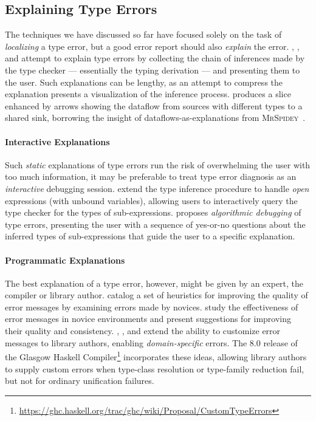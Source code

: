 \subsection{Explaining Type Errors}
\label{sec:explaining-type-errors}
The techniques we have discussed so far have focused solely on the task
of \emph{localizing} a type error, but a good error report should also
\emph{explain} the error.
%
\citet{Wand1986-nw}, \citet{Beaven1993-hb}, and \citet{Duggan1996-by}
attempt to explain type errors by collecting the chain of inferences
made by the type checker --- essentially the typing derivation ---
and presenting them to the user.
%
Such explanations can be lengthy, as an attempt to compress the
explanation \citet{Yang2000-kz} presents a visualization of the
inference process.
%
\citet{Gast2004-zd} produces a slice enhanced by arrows
showing the dataflow from sources with different types to a
shared sink, borrowing the insight of dataflows-as-explanations from
\textsc{MrSpidey}~\citep{Flanagan1996-bu}.
%

\paragraph{Interactive Explanations}
Such \emph{static} explanations of type errors run the risk of
overwhelming the user with too much information, it may be preferable to
treat type error diagnosis as an \emph{interactive} debugging session.
%
\citet{Bernstein1995-yj} extend the type inference procedure to handle
\emph{open} expressions (\ie with unbound variables), allowing users to
interactively query the type checker for the types of sub-expressions.
%
\citet{Chitil2001-td} proposes \emph{algorithmic debugging} of type
errors, presenting the user with a sequence of yes-or-no questions about
the inferred types of sub-expressions that guide the user to a specific
explanation.

\paragraph{Programmatic Explanations}
%
The best explanation of a type error, however, might be given by an
expert, \eg the compiler or library author.
%
\citet{Hage2006-hc} catalog a set of heuristics for
improving the quality of error messages by examining errors made by
novices.
%
\citet{Marceau2011-ok,Marceau2011-cy} study the effectiveness of error
messages in novice environments and present suggestions for improving
their quality and consistency.
%
\citet{Heeren2003-db}, \citet{Christiansen2014-qc}, and
\citet{Serrano2016-oo} extend the ability to customize error messages to
library authors, enabling \emph{domain-specific} errors.
%
The 8.0 release of the
Glasgow Haskell Compiler\footnote{\url{https://ghc.haskell.org/trac/ghc/wiki/Proposal/CustomTypeErrors}}
incorporates these ideas, allowing library authors to supply
custom errors when type-class resolution or type-family reduction fail,
but not for ordinary unification failures.


